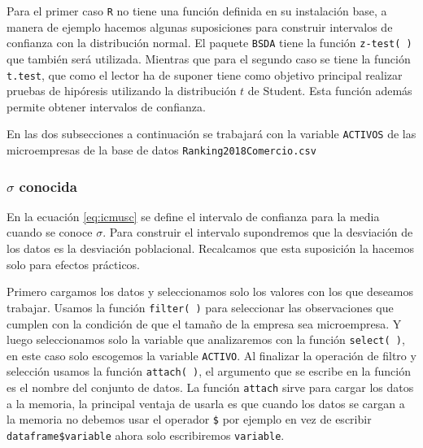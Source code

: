 \documentclass[letterpaper,]{book}
\newenvironment{Shaded}{\begin{snugshade}}{\end{snugshade}}
\newcommand{\DataTypeTok}[1]{\textcolor[rgb]{0.13,0.29,0.53}{#1}}
\newcommand{\KeywordTok}[1]{\textcolor[rgb]{0.13,0.29,0.53}{\textbf{#1}}}
\newcommand{\NormalTok}[1]{#1}
\newcommand{\OperatorTok}[1]{\textcolor[rgb]{0.81,0.36,0.00}{\textbf{#1}}}
\newcommand{\OtherTok}[1]{\textcolor[rgb]{0.56,0.35,0.01}{#1}}
\newcommand{\StringTok}[1]{\textcolor[rgb]{0.31,0.60,0.02}{#1}}
\begin{document}
Para el primer caso \texttt{R} no tiene una función definida en su instalación base, a manera de ejemplo hacemos algunas suposiciones para construir intervalos de confianza con la distribución normal. El paquete \texttt{BSDA} tiene la función \texttt{z-test(\ )} que también será utilizada. Mientras que para el segundo caso se tiene la función \texttt{t.test}, que como el lector ha de suponer tiene como objetivo principal realizar pruebas de hipóresis utilizando la distribución \(t\) de Student. Esta función además permite obtener intervalos de confianza.

En las dos subsecciones a continuación se trabajará con la variable \texttt{ACTIVOS} de las microempresas de la base de datos \texttt{Ranking2018Comercio.csv}

\hypertarget{musc}{%
\subsubsection{\texorpdfstring{\(\sigma\) conocida}{\textbackslash{}sigma conocida}}\label{musc}}

En la ecuación \eqref{eq:icmusc} se define el intervalo de confianza para la media cuando se conoce \(\sigma\). Para construir el intervalo supondremos que la desviación de los datos es la desviación poblacional. Recalcamos que esta suposición la hacemos solo para efectos prácticos.

Primero cargamos los datos y seleccionamos solo los valores con los que deseamos trabajar. Usamos la función \texttt{filter(\ )} para seleccionar las observaciones que cumplen con la condición de que el tamaño de la empresa sea microempresa. Y luego seleccionamos solo la variable que analizaremos con la función \texttt{select(\ )}, en este caso solo escogemos la variable \texttt{ACTIVO}. Al finalizar la operación de filtro y selección usamos la función \texttt{attach(\ )}, el argumento que se escribe en la función es el nombre del conjunto de datos. La función \texttt{attach} sirve para cargar los datos a la memoria, la principal ventaja de usarla es que cuando los datos se cargan a la memoria no debemos usar el operador \texttt{\$} por ejemplo en vez de escribir \texttt{dataframe\$variable} ahora solo escribiremos \texttt{variable}.

\begin{Shaded}
\end{Shaded}
\end{document}

